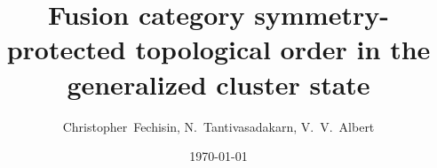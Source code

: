 \title
[%
Quantum Information Processing (QIP), 4 -- 10 Feb 2023, Ghent University
]
{%
Fusion category symmetry-protected topological order in the generalized cluster state
}


\author{%
  Christopher~Fechisin,
  N.~Tantivasadakarn,
  V.~V.~Albert
}




\date{\today}
